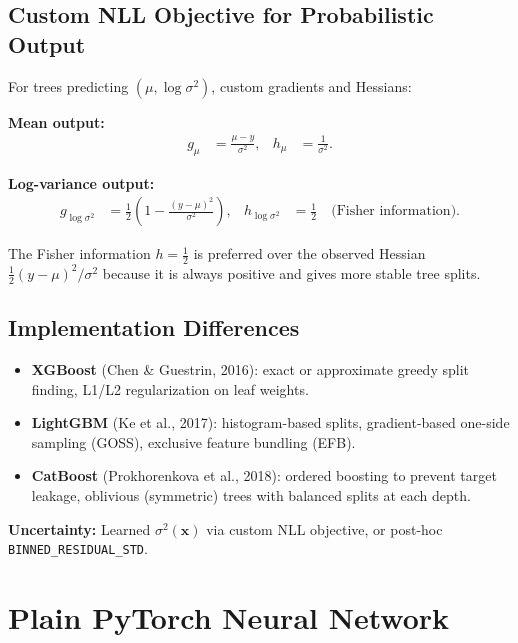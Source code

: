 \documentclass[11pt,a4paper]{article}
\theoremstyle{definition}
\newcommand{\bx}{\mathbf{x}}
\begin{document}
\subsection{Custom NLL Objective for Probabilistic Output}
\label{sec:tree_nll}

For trees predicting $(\mu, \log\sigma^2)$, custom gradients and Hessians:

\textbf{Mean output:}
\begin{align}
  g_\mu &= \frac{\mu - y}{\sigma^2}, &
  h_\mu &= \frac{1}{\sigma^2}.
\end{align}

\textbf{Log-variance output:}
\begin{align}
  g_{\log\sigma^2} &= \frac{1}{2}\left(1 - \frac{(y - \mu)^2}{\sigma^2}\right), &
  h_{\log\sigma^2} &= \frac{1}{2} \quad \text{(Fisher information)}.
  \label{eq:tree_hessian}
\end{align}

The Fisher information $h = \tfrac{1}{2}$ is preferred over the observed
Hessian $\tfrac{1}{2}(y-\mu)^2/\sigma^2$ because it is always positive and
gives more stable tree splits.

\subsection{Implementation Differences}

\begin{itemize}[nosep]
  \item \textbf{XGBoost} (Chen \& Guestrin, 2016): exact or approximate greedy split finding, L1/L2 regularization on leaf weights.
  \item \textbf{LightGBM} (Ke et al., 2017): histogram-based splits, gradient-based one-side sampling (GOSS), exclusive feature bundling (EFB).
  \item \textbf{CatBoost} (Prokhorenkova et al., 2018): ordered boosting to prevent target leakage, oblivious (symmetric) trees with balanced splits at each depth.
\end{itemize}

\textbf{Uncertainty:} Learned $\sigma^2(\bx)$ via custom NLL objective, or
post-hoc \texttt{BINNED\_RESIDUAL\_STD}.

\section{Plain PyTorch Neural Network}
\end{document}
